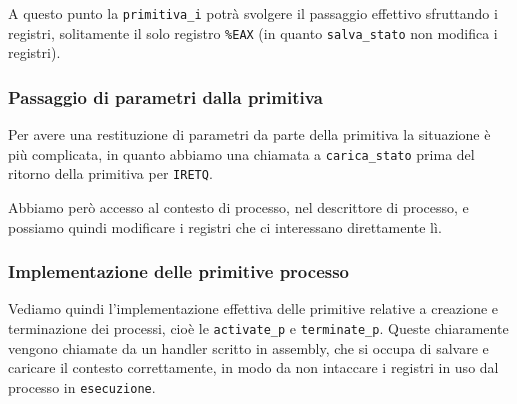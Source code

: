 \documentclass[a4paper,11pt]{article}
\begin{document}
A questo punto la \lstinline|primitiva_i| potrà svolgere il passaggio effettivo sfruttando i registri, solitamente il solo registro \lstinline|%EAX| (in quanto \lstinline|salva_stato| non modifica i registri).

\subsubsection{Passaggio di parametri dalla primitiva}
Per avere una restituzione di parametri da parte della primitiva la situazione è più complicata, in quanto abbiamo una chiamata a \lstinline|carica_stato| prima del ritorno della primitiva per \lstinline|IRETQ|.

Abbiamo però accesso al contesto di processo, nel descrittore di processo, e possiamo quindi modificare i registri che ci interessano direttamente lì.

\subsubsection{Implementazione delle primitive processo}
Vediamo quindi l'implementazione effettiva delle primitive relative a creazione e terminazione dei processi, cioè le \lstinline|activate_p| e \lstinline|terminate_p|.
Queste chiaramente vengono chiamate da un handler scritto in assembly, che si occupa di salvare e caricare il contesto correttamente, in modo da non intaccare i registri in uso dal processo in \lstinline|esecuzione|.
\end{document}
